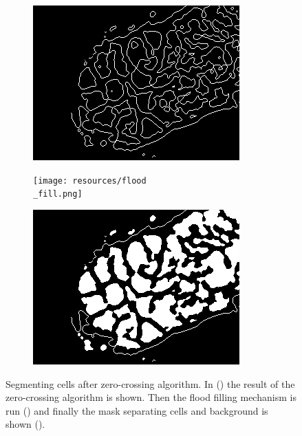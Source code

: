 \documentclass[
  digital,     %
  oneside,     %
  nosansbold,  %
  nocolorbold, %
  lof,         %
  lot,         %
]{fithesis4}
\begin{document}
\begin{figure}
    \begin{subfigure}[t]{0.48\textwidth}
        \centering
        \includegraphics[width=\textwidth]{resources/zc.png}
        \caption{}
        \label{fig:fill-map-zc}
    \end{subfigure}
    \begin{subfigure}[t]{0.48\textwidth}
        \centering
        \texttt{[image: resources/flood\\\_fill.png]}
        \caption{}
        \label{fig:fill-map-flood-fill}
    \end{subfigure}
    \begin{subfigure}[t]{0.48\textwidth}
        \centering
        \includegraphics[width=\textwidth]{resources/mask-dist.png}
        \caption{}
        \label{fig:fill-map-mask}
    \end{subfigure}
    \caption{Segmenting cells after zero-crossing algorithm. In
    () the result of the zero-crossing algorithm is
    shown. Then the flood filling mechanism is run
    () and finally the mask separating cells and
    background is shown ().}
    \label{fig:flood_fill}
\end{figure}
\end{document}
